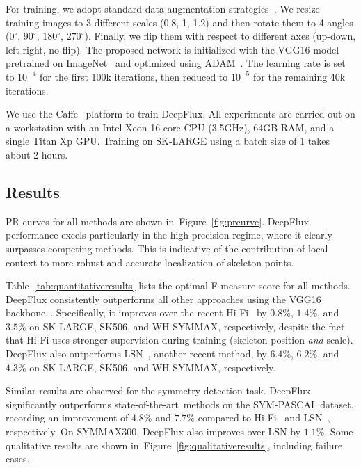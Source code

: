 \documentclass[10pt,twocolumn,letterpaper]{article}
\def\sota{state-of-the-art}
\newcommand{\reffig}[1]{Figure~\ref{#1}}
\newcommand{\reftab}[1]{Table~\ref{#1}}
\begin{document}
For training, we adopt standard data augmentation strategies~\cite{shen2016fsds,shen2017lmsds,zhao2018hifi}.
We resize training images to 3 different scales (0.8, 1, 1.2) and then rotate them to 4 angles ($0^\circ$, $90^\circ$, $180^\circ$, $270^\circ$).
Finally, we flip them with respect to different axes (up-down, left-right, no flip).
The proposed network is initialized with the VGG16 model pretrained on ImageNet~\cite{imagenet} and optimized using ADAM~\cite{kinga2015adam}.
The learning rate is set to $10^{-4}$ for the first 100k iterations, then reduced to $10^{-5}$ for the remaining 40k iterations.

We use the Caffe~\cite{jia2014caffe} platform to train DeepFlux. All experiments are carried out on a workstation with an Intel Xeon 16-core CPU (3.5GHz), 64GB RAM, and a single Titan Xp GPU.
Training on SK-LARGE using a batch size of 1 takes about 2 hours.





\subsection{Results} \label{sec:results}
PR-curves for all methods are shown in~\reffig{fig:prcurve}.
DeepFlux performance excels particularly in the high-precision regime, where it clearly surpasses competing methods.
This is indicative of the contribution of local context to more robust and accurate localization of skeleton points.

\reftab{tab:quantitativeresults} lists the optimal F-measure score for all methods.
DeepFlux consistently outperforms all other approaches using the VGG16 backbone~\cite{vgg16network}.
Specifically, it improves over the recent Hi-Fi~\cite{zhao2018hifi} by $0.8\%$, $1.4\%$, and $3.5\%$ on SK-LARGE, SK506, and WH-SYMMAX, respectively, despite the fact that Hi-Fi uses stronger supervision during training (skeleton position \emph{and} scale).
DeepFlux also outperforms LSN~\cite{liu2018lsn}, another recent method, by $6.4\%$, $6.2\%$, and $4.3\%$ on SK-LARGE, SK506, and WH-SYMMAX, respectively.

Similar results are observed for the symmetry detection task.
DeepFlux significantly outperforms \sota\ methods on the SYM-PASCAL dataset, recording an improvement of $4.8\%$ and $7.7\%$ compared to Hi-Fi~\cite{zhao2018hifi} and LSN~\cite{liu2018lsn}, respectively.
On SYMMAX300, DeepFlux also improves over LSN by $1.1\%$.
Some qualitative results are shown in~\reffig{fig:qualitativeresults}, including failure cases.
\end{document}
